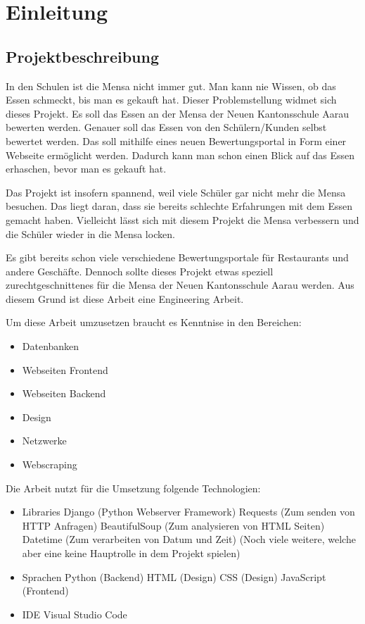 \chapter{Einleitung}\label{chap:einleit}
\section{Projektbeschreibung}\label{sec:projektbeschreibung}

In den Schulen ist die Mensa nicht immer gut. Man kann nie Wissen, ob das Essen
schmeckt, bis man es gekauft hat. Dieser Problemstellung widmet sich dieses
Projekt. Es soll das Essen an der Mensa der Neuen Kantonsschule Aarau bewerten
werden. Genauer soll das Essen von den Schülern/Kunden selbst bewertet werden.
Das soll mithilfe eines neuen Bewertungsportal in Form einer Webseite ermöglicht
werden. Dadurch kann man schon einen Blick auf das Essen erhaschen, bevor man es
gekauft hat.

Das Projekt ist insofern spannend, weil viele Schüler gar nicht mehr die Mensa
besuchen. Das liegt daran, dass sie bereits schlechte Erfahrungen mit dem Essen
gemacht haben. Vielleicht lässt sich mit diesem Projekt die Mensa verbessern und
die Schüler wieder in die Mensa locken.

Es gibt bereits schon viele verschiedene Bewertungsportale für Restaurants und
andere Geschäfte. Dennoch sollte dieses Projekt etwas speziell
zurechtgeschnittenes für die Mensa der Neuen Kantonsschule Aarau werden.
Aus diesem Grund ist diese Arbeit eine Engineering Arbeit.

Um diese Arbeit umzusetzen braucht es Kenntnise in den Bereichen:
\begin{itemize}
    \item Datenbanken
    \item Webseiten Frontend
    \item Webseiten Backend
    \item Design
    \item Netzwerke
    \item Webscraping
\end{itemize}

Die Arbeit nutzt für die Umsetzung folgende Technologien:
\begin{itemize}
    \item Libraries
    \subitem Django (Python Webserver Framework)
    \subitem Requests  (Zum senden von HTTP Anfragen)
    \subitem BeautifulSoup  (Zum analysieren von HTML Seiten)
    \subitem Datetime (Zum verarbeiten von Datum und Zeit)
    \subitem (Noch viele weitere, welche aber eine keine Hauptrolle in dem Projekt spielen)
    \item Sprachen
    \subitem Python (Backend)
    \subitem HTML (Design)
    \subitem CSS (Design)
    \subitem JavaScript (Frontend)
    \item IDE
    \subitem Visual Studio Code
\end{itemize}

